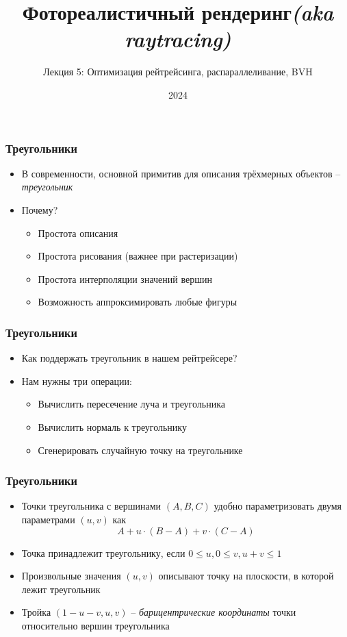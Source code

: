 \documentclass[handout,10pt]{beamer}
\title{Фотореалистичный рендеринг\quad\quad\quad\quad\quad\quad \textit{(aka raytracing)}}
\subtitle{Лекция 5: Оптимизация рейтрейсинга, распараллеливание, BVH}
\date{2024}
\begin{document}
\frame{\titlepage}

\begin{frame}
\frametitle{Треугольники}
\begin{itemize}
\item В современности, основной примитив для описания трёхмерных объектов -- \textit{треугольник}
\pause
\item Почему?
\pause
\begin{itemize}
\item Простота описания
\pause
\item Простота рисования (важнее при растеризации)
\pause
\item Простота интерполяции значений вершин
\pause
\item Возможность аппроксимировать любые фигуры
\end{itemize}
\end{itemize}
\end{frame}

\begin{frame}
\frametitle{Треугольники}
\begin{itemize}
\item Как поддержать треугольник в нашем рейтрейсере?
\pause
\item Нам нужны три операции:
\pause
\begin{itemize}
\item Вычислить пересечение луча и треугольника
\pause
\item Вычислить нормаль к треугольнику
\pause
\item Сгенерировать случайную точку на треугольнике
\end{itemize}
\end{itemize}
\end{frame}

\begin{frame}
\frametitle{Треугольники}
\begin{itemize}
\item Точки треугольника с вершинами \begin{math}(A,B,C)\end{math} удобно параметризовать двумя параметрами \begin{math}(u,v)\end{math} как
\begin{equation*}
A + u\cdot (B-A) + v\cdot (C-A)
\end{equation*}
\pause
\item Точка принадлежит треугольнику, если \begin{math}0 \leq u, 0 \leq v, u + v \leq 1\end{math}
\pause
\item Произвольные значения \begin{math}(u,v)\end{math} описывают точку на плоскости, в которой лежит треугольник
\pause
\item Тройка \begin{math}(1-u-v, u, v)\end{math} -- \textit{барицентрические координаты} точки относительно вершин треугольника
\end{itemize}
\end{frame}
\end{document}
